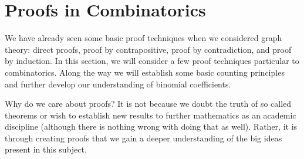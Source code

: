 \documentclass[10pt,]{book}
\theoremstyle{plain}
\theoremstyle{definition}
\theoremstyle{definition}
\theoremstyle{definition}
\numberwithin{equation}{chapter}
\begin{document}
\section[{Proofs in Combinatorics}]{Proofs in Combinatorics}\label{sec_basic-proofs}
\hypertarget{p-543}{}%
We have already seen some basic proof techniques when we considered graph theory: direct proofs, proof by contrapositive, proof by contradiction, and proof by induction.  In this section, we will consider a few proof techniques particular to combinatorics.  Along the way we will establish some basic counting principles and further develop our understanding of binomial coefficients.%
\par
\hypertarget{p-544}{}%
Why do we care about proofs?  It is not because we doubt the truth of so called theorems or wish to establish new results to further mathematics as an academic discipline (although there is nothing wrong with doing that as well).  Rather, it is through creating proofs that we gain a deeper understanding of the big ideas present in this subject.%
\typeout{************************************************}
\typeout{************************************************}
\end{document}
